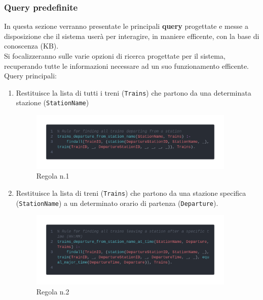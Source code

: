 \documentclass[italian,12pt,a4paper]{article}
\begin{document}
	\subsubsection{Query predefinite}
	In questa sezione verranno presentate le principali \textbf{query} progettate e messe a disposizione che il sistema userà per interagire, in maniere efficente, con la base di conoscenza (KB).\\
	\linebreak
	Si focalizzeranno sulle varie opzioni di ricerca progettate per il sistema, recuperando tutte le informazioni necessare ad un suo funzionamento efficente. \\
	\linebreak
	Query principali:
	
	
	\begin{enumerate}
		\item Restituisce la lista di tutti i treni (\texttt{Trains}) che partono da una determinata stazione (\texttt{StationName})
			\begin{figure}[h]
				\centering
				\includegraphics[width=370px]{img/code1}
				\caption{Regola n.1}
			\end{figure}
			
		\item Restituisce la lista di treni (\texttt{Trains}) che partono da una stazione specifica (\texttt{StationName}) a un determinato orario di partenza (\texttt{Departure}). 
			\begin{figure}[h]
				\centering
				\includegraphics[width=370px]{img/code2}
				\caption{Regola n.2}


\end{figure}
\end{enumerate}
\end{document}
